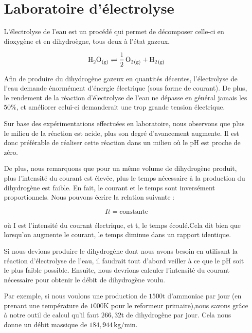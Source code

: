 \documentclass[a4paper, oneside, 12pt]{article}
\begin{document}
\section{Laboratoire d’électrolyse}

L'électrolyse de l'eau est un procédé qui permet de décomposer celle-ci en dioxygène et en dihydroègne, tous deux à l'état gazeux.

\begin{equation*}
	\ce{H2O_{(g)} \rightleftharpoons \frac{1}{2} \, O2_{(g)} + H2_{(g)}} 
\end{equation*}

Afin de produire du dihydrogène gazeux en quantités décentes, l'électrolyse de l'eau 
demande énormément d'énergie électrique (sous forme de courant). De plus, le rendement
de la réaction d'électrolyse de l'eau ne dépasse en général jamais les $50\%$, 
et améliorer celui-ci demanderait une trop grande tension électrique.

Sur base des expérimentations effectuées en laboratoire, nous observons que plus 
le milieu de la réaction est acide, plus son degré d'avancement augmente. Il est donc
préférable de réaliser cette réaction dans un milieu où le pH est proche de zéro.

De plus, nous remarquons que pour un même volume de dihydrogène produit, plus l’intensité du courant est élevée, plus le temps nécessaire à la production du dihydrogène est faible. En fait, le courant et le temps sont inversément proportionnels. Nous pouvons écrire la relation suivante :


\begin{equation*}
	It = \text{constante}
\end{equation*}

où I est l'intensité du courant électrique, et t, le temps écoulé.Cela dit bien que lorsqu'on augmente le courant, le temps diminue dans un rapport identique.

Si nous devions produire le dihydrogène dont nous avons besoin en utilisant la réaction d'électrolyse de l'eau, il faudrait tout d'abord veiller à ce que le pH soit le
plus faible possible. Ensuite, nous devrions calculer l'intensité du courant nécessaire pour obtenir le débit de dihydrogène voulu.

Par exemple, si nous voulons une production de $1500 \si{\tonne}$ d'ammoniac par jour (en prenant une température de $1000 \si{\kelvin}$ pour le reformeur primaire),nous savons grâce à notre outil de calcul qu'il faut $266,32 \si{\tonne}$ de dihydrogène par jour. Cela nous donne un débit massique de $184,944 \, \si{\kilo\gram/\minute}$.
\end{document}
